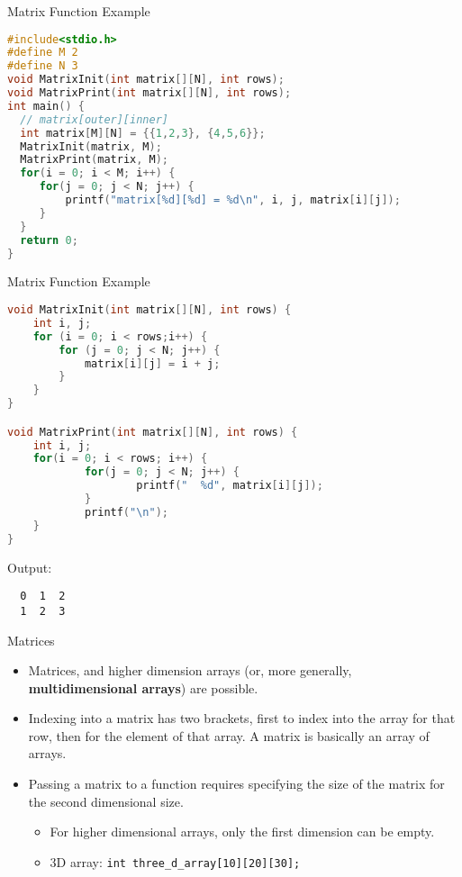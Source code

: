 \documentclass[graphics]{beamer}
\begin{document}
\begin{frame}[fragile]{Matrix Function Example}
    \begin{lstlisting}[language=C,basicstyle=\scriptsize,keywordstyle=\color{blue},commentstyle=\color{green},showstringspaces=false,stringstyle=\color{red}]
#include<stdio.h>
#define M 2
#define N 3
void MatrixInit(int matrix[][N], int rows);
void MatrixPrint(int matrix[][N], int rows);
int main() {
  // matrix[outer][inner]
  int matrix[M][N] = {{1,2,3}, {4,5,6}};
  MatrixInit(matrix, M);
  MatrixPrint(matrix, M);
  for(i = 0; i < M; i++) {
     for(j = 0; j < N; j++) {
         printf("matrix[%d][%d] = %d\n", i, j, matrix[i][j]);
     }
  }
  return 0;
}
    \end{lstlisting}
\end{frame}

\begin{frame}[fragile]{Matrix Function Example}
    \begin{lstlisting}[language=C,basicstyle=\scriptsize,keywordstyle=\color{blue},commentstyle=\color{green},showstringspaces=false,stringstyle=\color{red}]
void MatrixInit(int matrix[][N], int rows) {
    int i, j;
    for (i = 0; i < rows;i++) {
        for (j = 0; j < N; j++) {
            matrix[i][j] = i + j;
        }
    }
}

void MatrixPrint(int matrix[][N], int rows) {
    int i, j;
    for(i = 0; i < rows; i++) {
            for(j = 0; j < N; j++) {
                    printf("  %d", matrix[i][j]);
            }
            printf("\n");
    }
}
    \end{lstlisting}
    Output:
    \scriptsize
    \begin{verbatim}
  0  1  2
  1  2  3
    \end{verbatim}
\end{frame}

\begin{frame}{Matrices}
    \begin{itemize}
        \item Matrices, and higher dimension arrays (or, more generally, \textbf{multidimensional arrays}) are possible.
        \item Indexing into a matrix has two brackets, first to index into the array for that row, then for the element of that array. A matrix is basically an array of arrays.
        \item Passing a matrix to a function requires specifying the size of the matrix for the second dimensional size.
        \begin{itemize}
            \item For higher dimensional arrays, only the first dimension can be empty.
            \item 3D array: \texttt{int three\_d\_array[10][20][30];}
        \end{itemize}
    \end{itemize}
\end{frame}
\end{document}
